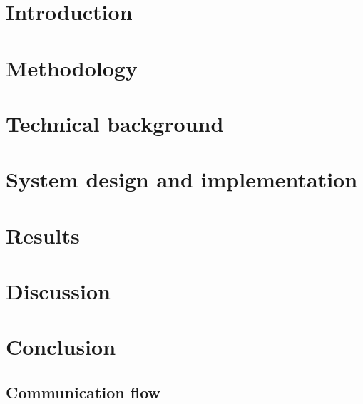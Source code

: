\documentclass[Report.tex]{subfiles}
\begin{document}
\chapter{Introduction}\label{sec:intro}
  

\chapter{Methodology}\label{sec:methodology}
  

\chapter{Technical background}\label{sec:tech}
  

\chapter{System design and implementation}\label{sec:system}
  

\chapter{Results}\label{sec:results}
  

\chapter{Discussion}\label{sec:discussion}
  

\chapter{Conclusion}\label{sec:conclusion}
  

\nocite{*} %
\clearpage
\printbibliography%
\clearpage

\begin{appendices}
\chapter{Communication flow}

\end{appendices}
\end{document}
